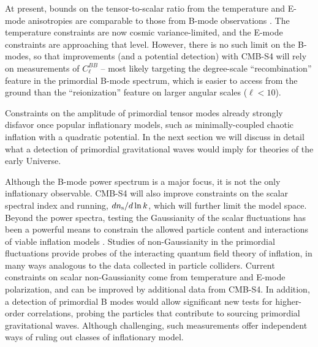 At present, bounds on the tensor-to-scalar ratio from the temperature and E-mode anisotropies are comparable to those from B-mode observations \cite{Ade:2013uln,Ade:2015lrj}. The temperature constraints are now cosmic variance-limited, and the E-mode constraints are approaching that level.  However, there is no such limit on the B-modes, so that improvements (and a potential detection) with CMB-S4 will rely on measurements of $C_\ell^{BB}$ -- most likely targeting the degree-scale ``recombination'' feature in the primordial B-mode spectrum, which is easier to access from the ground than the ``reionization'' feature on larger angular scales ($\ell < 10$).

Constraints on the amplitude of primordial tensor modes already strongly disfavor once popular inflationary models, such as minimally-coupled chaotic inflation with a quadratic potential. In the next section we will discuss in detail what a detection of primordial gravitational waves would imply for theories of the early Universe. 

Although the B-mode power spectrum is a major focus, it is not the only inflationary observable.
CMB-S4 will also improve constraints on the scalar spectral index and
running, $dn_{\rm s}/d\ln k$, which will further limit the model space.
Beyond the power spectra, testing the Gaussianity of the scalar fluctuations has been a powerful means to constrain the allowed particle content and interactions of viable inflation models \cite{Ade:2013ydc,Ade:2015ava}. Studies of non-Gaussianity in the primordial fluctuations provide probes of the interacting quantum field theory of inflation, in many ways analogous to the data collected in particle colliders. Current constraints on scalar non-Gaussianity come from temperature and E-mode polarization, and can be improved by additional data from CMB-S4. In addition, a detection of primordial B modes would allow significant new tests for higher-order correlations, probing the particles that contribute to sourcing primordial gravitational waves. Although challenging, such measurements offer independent ways of ruling out classes of inflationary model.

